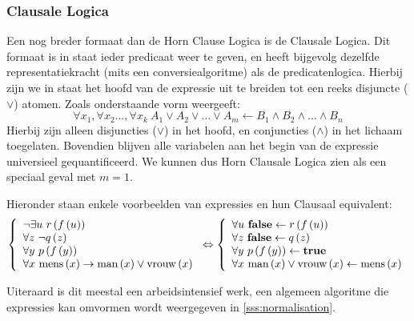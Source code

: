 \subsubsection{Clausale Logica}
\label{sss:clausaleLogic}
Een nog breder formaat dan de Horn Clause Logica is de Clausale Logica. Dit formaat is in staat ieder predicaat weer te geven, en heeft bijgevolg dezelfde representatiekracht (mits een conversiealgoritme) als de predicatenlogica. Hierbij zijn we in staat het hoofd van de expressie uit te breiden tot een reeks disjuncte ($\vee$) atomen. Zoals onderstaande vorm weergeeft:
\begin{equation}
\forall x_1,\forall x_2\ldots,\forall x_k\ A_1\vee A_2\vee\ldots\vee A_m\leftarrow B_1\wedge B_2\wedge\ldots\wedge B_n
\end{equation}
Hierbij zijn alleen disjuncties ($\vee$) in het hoofd, en conjuncties ($\wedge$) in het lichaam toegelaten. Bovendien blijven alle variabelen aan het begin van de expressie universieel gequantificeerd. We kunnen dus Horn Clausale Logica zien als een speciaal geval met $m=1$.
\begin{leftbar}
Hieronder staan enkele voorbeelden van expressies en hun Clausaal equivalent:
\begin{equation}
\left\{\begin{array}{l}
\neg\exists u\ r\left(f\left(u\right)\right)\\
\forall z\ \neg q\left(z\right)\\
\forall y\ p\left(f\left(y\right)\right)\\
\forall x\ \mathfunc{mens}{x}\rightarrow\mathfunc{man}{x}\vee\mathfunc{vrouw}{x}
\end{array}\right.\Leftrightarrow\left\{\begin{array}{l}
\forall u\ \false\leftarrow r\left(f\left(u\right)\right)\\
\forall z\ \false\leftarrow q\left(z\right)\\
\forall y\ p\left(f\left(y\right)\right)\leftarrow\true\\
\forall x\ \mathfunc{man}{x}\vee\mathfunc{vrouw}{x}\leftarrow\mathfunc{mens}{x}
\end{array}\right.
\end{equation}
\end{leftbar}
Uiteraard is dit meestal een arbeidsintensief werk, een algemeen algoritme die expressies kan omvormen wordt weergegeven in \ref{sss:normalisation}.
